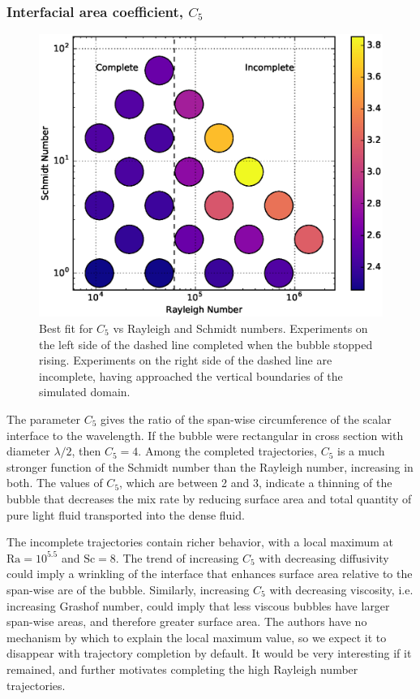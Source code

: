 \subsubsection{Interfacial area coefficient, $C_5$}
\begin{figure}
\includegraphics[width=\columnwidth]{figs/C5-vs-Rayleigh-Schmidt}
\caption{ 
  Best fit for $C_5$ vs Rayleigh and Schmidt numbers.
  Experiments on the left side of the dashed line completed when the bubble stopped rising.
  Experiments on the right side of the dashed line are incomplete, having approached the vertical boundaries of the simulated domain.
}
\end{figure}

The parameter $C_5$ gives the ratio of the span-wise circumference of the scalar interface to the wavelength.
If the bubble were rectangular in cross section with diameter $\lambda / 2$, then $C_5 = 4$.
Among the completed trajectories, $C_5$ is a much stronger function of the Schmidt number than the Rayleigh number, increasing in both.
The values of $C_5$, which are between 2 and 3, indicate a thinning of the bubble that decreases the mix rate by reducing surface area and total quantity of pure light fluid transported into the dense fluid.

The incomplete trajectories contain richer behavior, with a local maximum at $\text{Ra} = 10^{5.5}$ and $\text{Sc} = 8$.
The trend of increasing $C_5$ with decreasing diffusivity could imply a wrinkling of the interface that enhances surface area relative to the span-wise are of the bubble.
Similarly, increasing $C_5$ with decreasing viscosity, i.e. increasing Grashof number, could imply that less viscous bubbles have larger span-wise areas, and therefore greater surface area.
The authors have no mechanism by which to explain the local maximum value, so we expect it to disappear with trajectory completion by default.
It would be very interesting if it remained, and further motivates completing the high Rayleigh number trajectories.

